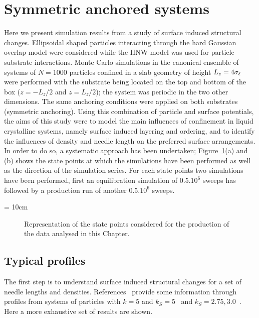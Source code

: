 \section{Symmetric anchored systems}
\label{s:simRes}

Here we present simulation results from a study of surface induced structural changes.
Ellipsoidal shaped particles interacting through the hard Gaussian overlap model were 
considered while the HNW model was used for particle-substrate interactions.
Monte Carlo simulations in the canonical ensemble of systems of $N=1000$ particles 
confined in a slab geometry of height $L_z=4\sigma_\ell$ were performed with
the substrate being located on the top and bottom of the box ($z=-L_z/2$ and $z=L_z/2$); 
the system was periodic in the two other dimensions.
The same anchoring conditions were applied on both substrates (symmetric anchoring).
Using this combination of particle and surface potentials, the aims of this study were 
to model the main influences of confinement in liquid crystalline systems, namely surface 
induced layering and ordering, and to identify the influences of density and needle length 
on the preferred  surface arrangements.
In order to do so, a systematic approach has been undertaken; Figure~\ref{fig:simsDia_HNW}(a) 
and (b) shows the state points at which the simulations have been performed 
as well as the direction of the simulation series. 
For each state points two simulations have been performed, first an equilibration simulation 
of $0.5.10^6$ sweeps has followed by a production run of another $0.5.10^6$ sweeps.

\picW = 10cm
\begin{figure}
	\centering
	\caption{Representation of the state points considered for the production of the data
	analysed in this Chapter.}
	\label{fig:simsDia_HNW}
\end{figure}

\subsection{Typical profiles}
\label{ss:typicalProfiles}

The first step is to understand surface induced structural changes for a set of needle
lengths and densities. References~\cite{Chrzanowska_Teixera_01,Cleaver_Teixeira_01} 
provide some information through profiles from systems of particles with $k=5$ and 
$k_S=5$~\cite{Chrzanowska_Teixera_01} and $k_S = 2.75,3.0$~\cite{Cleaver_Teixeira_01}. Here a
more exhaustive set of results are shown.\\

